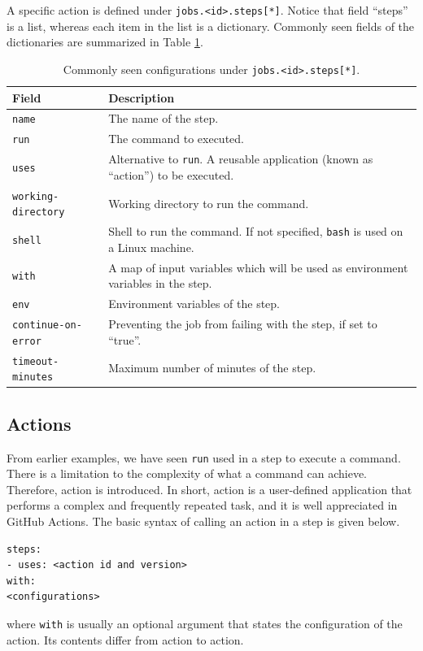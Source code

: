 A specific action is defined under \texttt{jobs.<id>.steps[*]}. Notice that field ``steps'' is a list, whereas each item in the list is a dictionary. Commonly seen fields of the dictionaries are summarized in Table \ref{tab:githubactions_steps}.
\begin{table}[!htb]
	\centering \caption{Commonly seen configurations under \texttt{jobs.<id>.steps[*]}.}\label{tab:githubactions_steps}
	\begin{tabularx}{\textwidth}{lX}
		\hline
		Field & Description \\ \hline
		\texttt{name} & The name of the step. \\ 
		\texttt{run} & The command to executed. \\
		\texttt{uses} & Alternative to \texttt{run}. A reusable application (known as ``action'') to be executed. \\
		\texttt{working-directory} & Working directory to run the command. \\
		\texttt{shell} & Shell to run the command. If not specified, \texttt{bash} is used on a Linux machine. \\
		\texttt{with} & A map of input variables which will be used as environment variables in the step. \\
		\texttt{env} & Environment variables of the step. \\
		\texttt{continue-on-error} & Preventing the job from failing with the step, if set to ``true''. \\
		\texttt{timeout-minutes} & Maximum number of minutes of the step. \\
		\hline
	\end{tabularx}
\end{table}

\subsection{Actions}

From earlier examples, we have seen \verb|run| used in a step to execute a command. There is a limitation to the complexity of what a command can achieve. Therefore, action is introduced. In short, action is a user-defined application that performs a complex and frequently repeated task, and it is well appreciated in GitHub Actions. The basic syntax of calling an action in a step is given below.
\begin{lstlisting}
steps:
- uses: <action id and version>
with:
<configurations>    
\end{lstlisting}
where \verb|with| is usually an optional argument that states the configuration of the action. Its contents differ from action to action.

